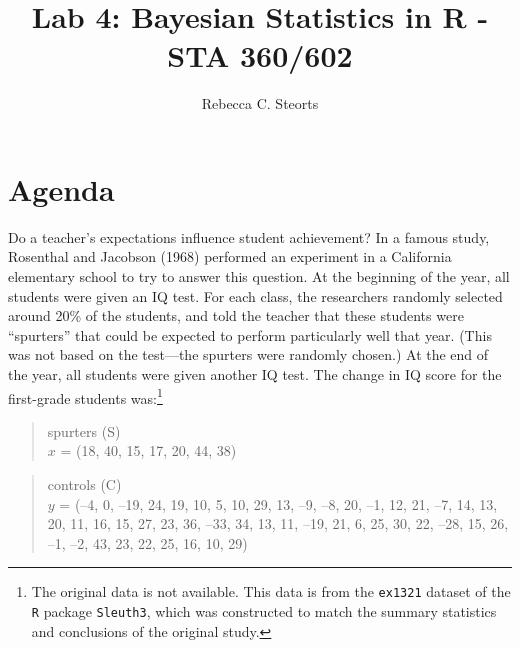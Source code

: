 \documentclass{article}
\begin{document}
\title{Lab 4: Bayesian Statistics in \textsf{R} - STA 360/602}
\author{Rebecca C. Steorts}
\date{}
\maketitle



\section{Agenda}
Do a teacher's expectations influence student achievement? In a famous study, Rosenthal and Jacobson (1968) performed an experiment in a California elementary school to try to answer this question. At the beginning of the year, all students were given an IQ test.  For each class, the researchers randomly selected around 20\% of the students, and told the teacher that these students were ``spurters'' that could be expected to perform particularly well that year. (This was not based on the test---the spurters were randomly chosen.) At the end of the year, all students were given another IQ test. The change in IQ score for the first-grade students was:\footnote{The original data is not available. This data is from the \texttt{ex1321} dataset of the \texttt{R} package \texttt{Sleuth3}, which was constructed to match the summary statistics and conclusions of the original study.}

\begin{quote}
spurters (S)\\
$x$ = (18, 40, 15, 17, 20, 44, 38)
\end{quote}
\begin{quote}
controls (C)\\
$y$ = (--4, 0, --19, 24, 19, 10, 5, 10, 29, 13, --9, --8, 20, --1, 12, 21, --7, 14,
     13, 20, 11, 16, 15, 27, 23, 36, --33, 34, 13, 11, --19, 21, 6, 25, 30,
     22, --28, 15, 26, --1, --2, 43, 23, 22, 25, 16, 10, 29)
\end{quote}
\end{document}
